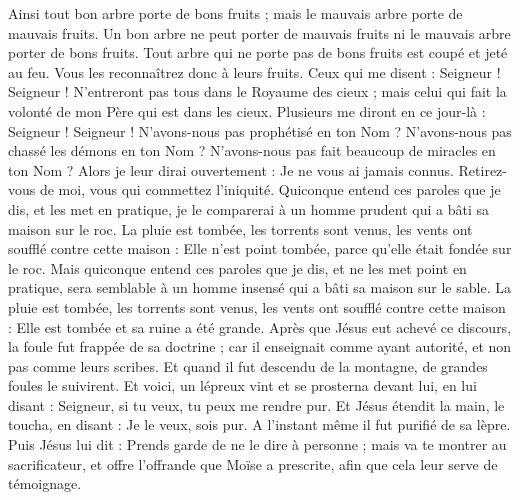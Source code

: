 \begin{multicols}{2}
Ainsi tout bon arbre porte de bons fruits ; mais le mauvais arbre porte de mauvais fruits.
Un bon arbre ne peut porter de mauvais fruits ni le mauvais arbre porter de bons fruits.
Tout arbre qui ne porte pas de bons fruits est coupé et jeté au feu.
Vous les reconnaîtrez donc à leurs fruits.
Ceux qui me disent : Seigneur ! Seigneur ! N’entreront pas tous dans le Royaume des cieux ; mais celui qui fait la volonté de mon Père qui est dans les cieux.
Plusieurs me diront en ce jour-là : Seigneur ! Seigneur ! N’avons-nous pas prophétisé en ton Nom ? N'avons-nous pas chassé les démons en ton Nom ? N'avons-nous pas fait beaucoup de miracles en ton Nom ?
Alors je leur dirai ouvertement : Je ne vous ai jamais connus. Retirez-vous de moi, vous qui commettez l'iniquité.
Quiconque entend ces paroles que je dis, et les met en pratique, je le comparerai à un homme prudent qui a bâti sa maison sur le roc.
La pluie est tombée, les torrents sont venus, les vents ont soufflé contre cette maison : Elle n'est point tombée, parce qu'elle était fondée sur le roc{}.
Mais quiconque entend ces paroles que je dis, et ne les met point en pratique, sera semblable à un homme insensé qui a bâti sa maison sur le sable.
La pluie est tombée, les torrents sont venus, les vents ont soufflé contre cette maison : Elle est tombée et sa ruine a été grande.
Après que Jésus eut achevé ce discours, la foule fut frappée de sa doctrine ;
car il enseignait comme ayant autorité, et non pas comme leurs scribes.
\VerseOne{}Et quand il fut descendu de la montagne, de grandes foules le suivirent.
Et voici, un lépreux vint et se prosterna devant lui, en lui disant : Seigneur{}, si tu veux, tu peux me rendre pur.
Et Jésus étendit la main, le toucha, en disant : Je le veux, sois pur. A l’instant même il fut purifié de sa lèpre.
Puis Jésus lui dit : Prends garde de ne le dire à personne ; mais va te montrer au sacrificateur, et offre l’offrande que Moïse a prescrite, afin que cela leur serve de témoignage.

\end{multicols}
